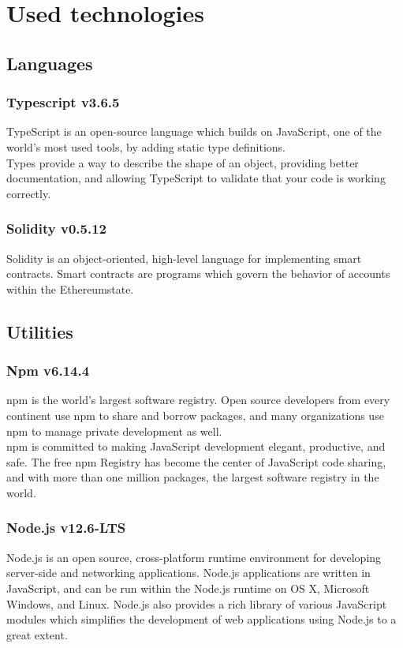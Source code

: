 \section{Used technologies}

\subsection{Languages}
\subsubsection*{Typescript v3.6.5}
TypeScript is an open-source language which builds on JavaScript, one of the world’s most used tools, by adding static type definitions.\\
Types provide a way to describe the shape of an object, providing better documentation, and allowing TypeScript to validate that your code is working correctly.

\subsubsection*{Solidity v0.5.12}
Solidity is an object-oriented, high-level language for implementing smart contracts.
Smart contracts are programs which govern the behavior of accounts within the Ethereum\glo state.

\subsection{Utilities}

\subsubsection*{Npm v6.14.4}
npm is the world’s largest software registry. Open source developers from every continent use npm to share and borrow packages, and many organizations use npm to manage private development as well.\\
npm is committed to making JavaScript development elegant, productive, and safe. The free npm Registry has become the center of JavaScript code sharing, and with more than one million packages, the largest software registry in the world. 

\subsubsection*{Node.js v12.6-LTS}
Node.js is an open source, cross-platform runtime environment for developing server-side and networking applications. 
Node.js applications are written in JavaScript, and can be run within the Node.js runtime on OS X, Microsoft Windows, and Linux.
Node.js also provides a rich library of various JavaScript modules which simplifies the development of web applications using Node.js to a great extent.

